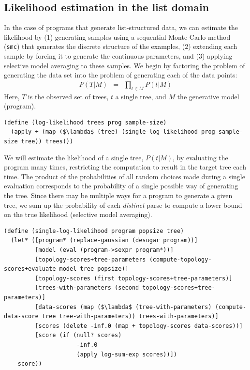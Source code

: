 \documentclass[a4paper,10pt]{article}
\begin{document}
\subsection{Likelihood estimation in the list domain}

In the case of programs that generate list-structured data, we can estimate the likelihood by (1) generating samples using a sequential Monte Carlo method (\texttt{smc}) that generates the discrete structure of the examples, (2) extending each sample by forcing it to generate the continuous parameters, and (3) applying selective model averaging to these samples. We begin by factoring the problem of generating the data set into the problem of generating each of the data points:
\begin{eqnarray}
P(T|M) &=& \prod_{t \in M}P(t|M)
\end{eqnarray}
Here, $T$ is the observed set of trees, $t$ a single tree, and $M$ the generative model (program).
\begin{lstlisting}[frame=trbl]
(define (log-likelihood trees prog sample-size)
  (apply + (map ($\lambda$ (tree) (single-log-likelihood prog sample-size tree)) trees)))
\end{lstlisting}
We will estimate the likelihood of a single tree, $P(t|M)$, by evaluating the program many times, restricting the computation to result in the target tree each time. The product of the probabilities of all random choices made during a single evaluation corresponds to the probability of a single possible way of generating the tree. Since there may be multiple ways for a program to generate a given tree, we sum up the probability of each {\em distinct} parse to compute a lower bound on the true likelihood (selective model averaging).
\begin{lstlisting}[frame=trbl]
(define (single-log-likelihood program popsize tree)
  (let* ([program* (replace-gaussian (desugar program))]
         [model (eval (program->sexpr program*))]
         [topology-scores+tree-parameters (compute-topology-scores+evaluate model tree popsize)]
         [topology-scores (first topology-scores+tree-parameters)]
         [trees-with-parameters (second topology-scores+tree-parameters)]
         [data-scores (map ($\lambda$ (tree-with-parameters) (compute-data-score tree tree-with-parameters)) trees-with-parameters)]
         [scores (delete -inf.0 (map + topology-scores data-scores))]
         [score (if (null? scores)
                     -inf.0
                     (apply log-sum-exp scores))])
    score))
\end{lstlisting}
\end{document}
